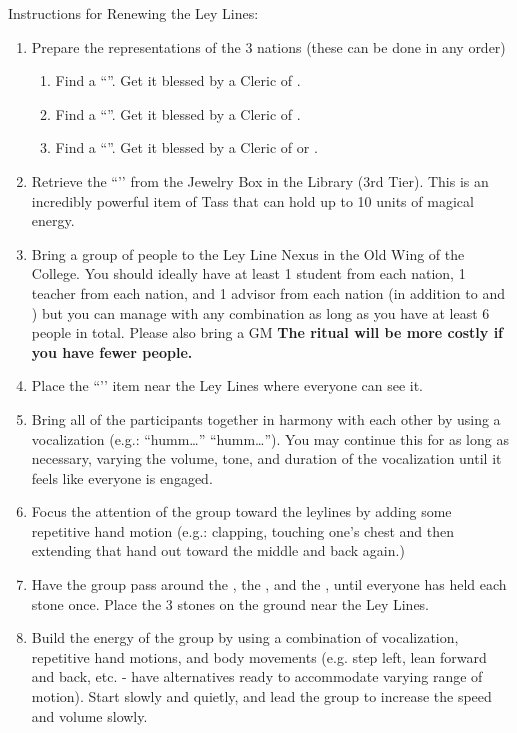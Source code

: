 \documentclass[green]{GL2020}
\begin{document}
Instructions for Renewing the Ley Lines:
\begin{enumerate}
  \item Prepare the representations of the 3 nations (these can be done in any order)
  \begin{enumerate}
    \item Find a ``\iClay{}''. Get it blessed by a Cleric of \cFarmGod{}.
    \item Find a ``\iObsidian{}''. Get it blessed by a Cleric of \cTechGod{}.
    \item Find a ``\iLimestone{}''. Get it blessed by a Cleric of \cEbb{} or \cFlow{}.
  \end{enumerate}  
 \item Retrieve the ``\iDiamond{}’’ from the Jewelry Box in the Library (3rd Tier). This is an incredibly powerful item of Tass that can hold up to 10 units of magical energy.
  \item Bring a group of people to the Ley Line Nexus in the Old Wing of the College. You should ideally have at least 1 student from each nation, 1 teacher from each nation, and 1 advisor from each nation (in addition to \cBeetle{} and \cPrincipal{}) but you can manage with any combination as long as you have at least 6 people in total. Please also bring a GM \textbf{The ritual will be more costly if you have fewer people.}
  \item Place the ``\iDiamond{}’’ item near the Ley Lines where everyone can see it.
  \item Bring all of the participants together in harmony with each other by using a vocalization (e.g.: “humm…” “humm…”). You may continue this for as long as necessary, varying the volume, tone, and duration of the vocalization until it feels like everyone is engaged.
  \item Focus the attention of the group toward the leylines by adding some repetitive hand motion (e.g.: clapping, touching one’s chest and then extending that hand out toward the middle and back again.)
  \item Have the group pass around the \iClay{}, the \iObsidian{}, and the \iLimestone{}, until everyone has held each stone once. Place the 3 stones on the ground near the Ley Lines.
  \item Build the energy of the group by using a combination of vocalization, repetitive hand motions, and body movements (e.g. step left, lean forward and back, etc. - have alternatives ready to accommodate varying range of motion). Start slowly and quietly, and lead the group to increase the speed and volume slowly.

\end{enumerate}
\end{document}
